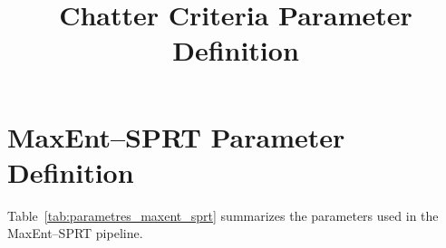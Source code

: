 \documentclass[12pt,a4paper, openany]{book}
\renewcommand{\arraystretch}{1.15}
\begin{document}
\title{Chatter Criteria Parameter Definition}
\author{}
\date{}
\maketitle

\glsaddall

\vspace{0.5em}
\printglossary[type=symbols,style=symbstyle]

\vspace{1em}


\vspace{0.5em}
\printglossary[type=parameters,style=paramstyle]


\newpage

\hypertarget{indice}{} %
\tableofcontents


\chapter{MaxEnt–SPRT Parameter Definition}

Table~\ref{tab:parametres_maxent_sprt} summarizes the parameters used in the MaxEnt--SPRT pipeline.


\small
\renewcommand{\arraystretch}{1.15}
\end{document}

